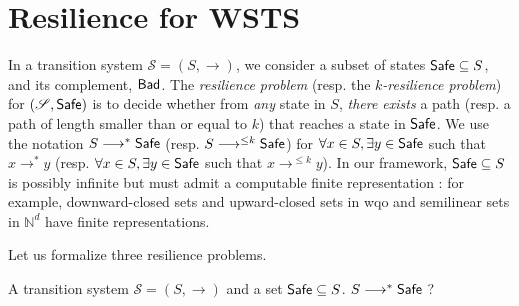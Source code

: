 
\section{Resilience for WSTS}




In a transition system $\mathscr{S}=(S,\rightarrow)$, we consider a subset of states $\textsf{Safe} \subseteq S$, and its complement, $\textsf{Bad}$.
The \emph{resilience problem} (resp. the \emph{$k$-resilience problem}) for $(\mathscr{S},\textsf{Safe})$ is to decide whether from \emph{any} state in %
$S$, \emph{there exists} a path (resp. a path of length smaller than or equal to $k$) that reaches a state in $\textsf{Safe}$. We use the notation 
$S \longrightarrow^{*} \textsf{Safe}$ (resp. $S \longrightarrow^{\leq k} \textsf{Safe}$)
 for 
$\forall x \in S, \exists y \in \textsf{Safe}$ 
 such that $x \longrightarrow^{*} y$ 
  (resp.  $\forall x \in S, \exists y \in \textsf{Safe}$ such that $x \longrightarrow^{\leq k} y$).
  In our framework, $\textsf{Safe} \subseteq S$  is possibly infinite but  must admit a computable finite representation : for example, downward-closed sets and upward-closed sets in wqo and semilinear sets in $\mathbb{N}^d$ have finite representations. 





Let us formalize three resilience problems.


{A transition system $\mathscr{S}=(S,\rightarrow)$ and a set $\textsf{Safe} \subseteq S$.}
{$S \longrightarrow^{*} \textsf{Safe}$ ?\newline}



